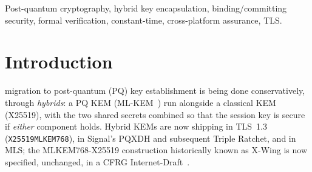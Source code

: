 \documentclass[journal]{IEEEtran}
\newcommand{\code}[1]{\texttt{\small #1}}
\begin{document}
\begin{abstract}
is a platform/toolchain-specific diagnostic for its recorded cohort, not current release provenance.
The current Rust workspace declares \code{0.2.0}; Continuity remains an unpublished
candidate. The historical \code{v0.1.5} Apple XCFramework GitHub release was published
on 2026-09-05. A pre-publication package-ready contract
alone does not prove crates.io upload-API acceptance,
crate-name ownership, publishing credentials or authorization, server-side policy acceptance,
or a registry receipt. Receipt-gated, attestation-bound stable GitHub targets cover
an Apple XCFramework revision and an Android/Linux platform distribution; the
unsigned Windows output remains an unsupported CI diagnostic outside that asset set.
No unverified registry publication, code-signing beyond the Apple lane, physical-device
coverage, or production release is claimed.
\end{abstract}

\begin{IEEEkeywords}
Post-quantum cryptography, hybrid key encapsulation, binding/committing security, formal
verification, constant-time, cross-platform assurance, TLS.
\end{IEEEkeywords}

\section{Introduction}\label{sec:intro}
 migration to post-quantum (PQ) key establishment is being done
conservatively, through \emph{hybrids}: a PQ KEM (ML-KEM~\cite{fips203}) run alongside a
classical KEM (X25519), with the two shared secrets combined so that the session key is
secure if \emph{either} component holds. Hybrid KEMs are now shipping in TLS~1.3
(\code{X25519MLKEM768}), in Signal's PQXDH and subsequent Triple Ratchet,
and in MLS; the MLKEM768-X25519 construction historically known as X-Wing is now
specified, unchanged, in a CFRG Internet-Draft~\cite{concretehybrid,xwing}.
\end{document}
